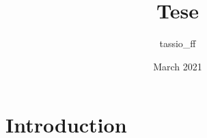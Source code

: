 \documentclass{article}
\title{Tese}
\author{tassio_ff }
\date{March 2021}
\begin{document}
\maketitle

\section{Introduction}
\end{document}

